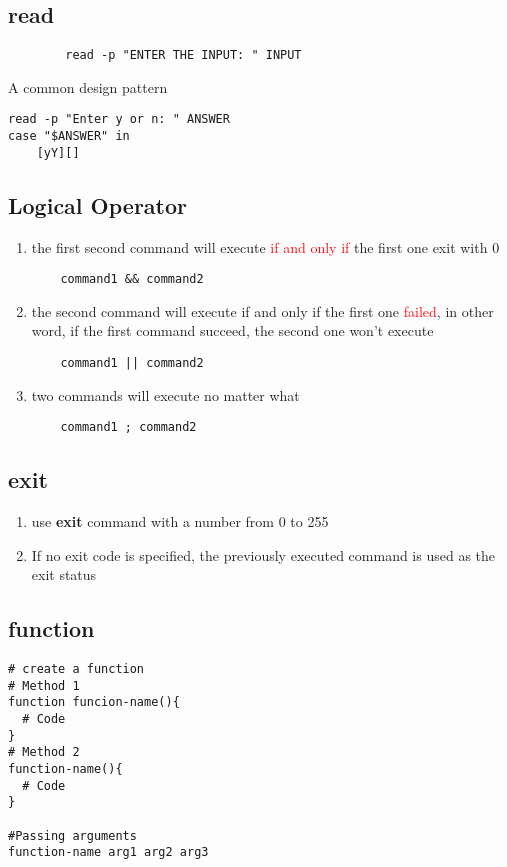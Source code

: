 \documentclass[12pt,a4paper]{article}
\newcommand{\rt}[1]{\textcolor{red}{#1}}
\begin{document}
\subsection{read}
\begin{footnotesize}
	\begin{verbatim}
		read -p "ENTER THE INPUT: " INPUT
	\end{verbatim}
\end{footnotesize}
A common design pattern
\begin{footnotesize}
\begin{verbatim}
read -p "Enter y or n: " ANSWER
case "$ANSWER" in
	[yY][]
\end{verbatim}
\end{footnotesize}

\subsection{Logical Operator}
\begin{enumerate}
	\item the first second command will execute \rt{if and only if} the first one exit with 0
	\begin{verbatim}
	command1 && command2
	\end{verbatim}
	\item the second command will execute if and only if the first one \rt{failed}, in other word, if the first command succeed, the second one won't execute
	\begin{verbatim}
	command1 || command2
	\end{verbatim}
	\item two commands will execute no matter what
	\begin{verbatim}
	command1 ; command2
	\end{verbatim}
\end{enumerate}

\subsection{exit}
\begin{enumerate}
	\item use \textbf{exit} command with a number from 0 to 255
	\item If no exit code is specified, the previously executed command is used as the exit status
\end{enumerate}

\subsection{function}
\begin{footnotesize}
\begin{verbatim}
# create a function
# Method 1
function funcion-name(){
  # Code
}
# Method 2
function-name(){
  # Code
}

#Passing arguments
function-name arg1 arg2 arg3
\end{verbatim}
\end{footnotesize}
\end{document}
